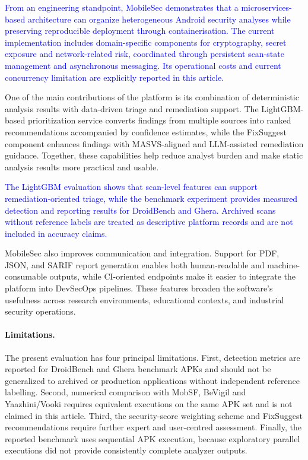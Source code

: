 \documentclass[preprint,12pt, a4paper]{elsarticle}
\begin{document}
\textcolor{blue}{From an engineering standpoint, MobileSec demonstrates that a microservices-based architecture can organize heterogeneous Android security analyses while preserving reproducible deployment through containerisation. The current implementation includes domain-specific components for cryptography, secret exposure and network-related risk, coordinated through persistent scan-state management and asynchronous messaging. Its operational costs and current concurrency limitation are explicitly reported in this article.}

One of the main contributions of the platform is its combination of deterministic analysis results with data-driven triage and remediation support. The LightGBM-based prioritization service converts findings from multiple sources into ranked recommendations accompanied by confidence estimates, while the FixSuggest component enhances findings with MASVS-aligned and LLM-assisted remediation guidance. Together, these capabilities help reduce analyst burden and make static analysis results more practical and usable.

\textcolor{blue}{The LightGBM evaluation shows that scan-level features can support remediation-oriented triage, while the benchmark experiment provides measured detection and reporting results for DroidBench and Ghera. Archived scans without reference labels are treated as descriptive platform records and are not included in accuracy claims.}

MobileSec also improves communication and integration. Support for PDF, JSON, and SARIF report generation enables both human-readable and machine-consumable outputs, while CI-oriented endpoints make it easier to integrate the platform into DevSecOps pipelines. These features broaden the software’s usefulness across research environments, educational contexts, and industrial security operations.

{\color{blue}\paragraph{Limitations.}
The present evaluation has four principal limitations. First, detection metrics are reported for DroidBench and Ghera benchmark APKs and should not be generalized to archived or production applications without independent reference labelling. Second, numerical comparison with MobSF, BeVigil and Yaazhini/Vooki requires equivalent executions on the same APK set and is not claimed in this article. Third, the security-score weighting scheme and FixSuggest recommendations require further expert and user-centred assessment. Finally, the reported benchmark uses sequential APK execution, because exploratory parallel executions did not provide consistently complete analyzer outputs.}
\end{document}
